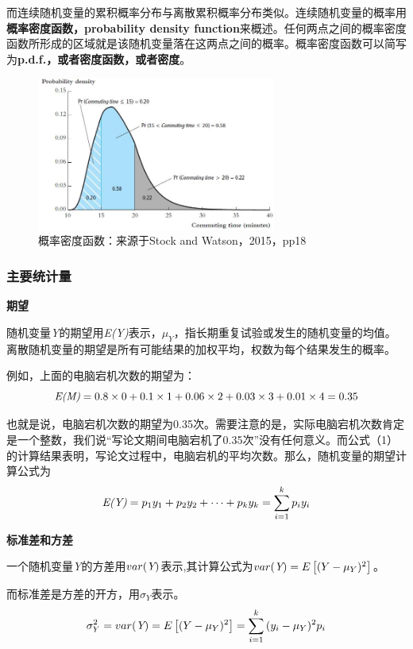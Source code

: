 \documentclass[cn,10pt,math=newtx,citestyle=gb7714-2015,bibstyle=gb7714-2015]{elegantbook}
\begin{document}
	而连续随机变量的累积概率分布与离散累积概率分布类似。连续随机变量的概率用\textbf{概率密度函数，probability density function}来概述。任何两点之间的概率密度函数所形成的区域就是该随机变量落在这两点之间的概率。概率密度函数可以简写为\textbf{p.d.f.，或者密度函数，或者密度}。
	\begin{figure}[htbp]
		\centering
		\includegraphics[width=0.7\textwidth]{pdf.jpg}
		\caption{概率密度函数：来源于Stock and Watson，2015，pp18}\label{fig:digit}
	\end{figure}
	
	\subsubsection{主要统计量}
	\textbf{期望}
	
	随机变量\emph{Y}的期望用\emph{E(Y)}表示，$\mu_{Y}$，指长期重复试验或发生的随机变量的均值。离散随机变量的期望是所有可能结果的加权平均，权数为每个结果发生的概率。
	
	例如，上面的电脑宕机次数的期望为：
	\begin{equation}
		\emph{E(M)}=0.8\times0+0.1\times1+0.06\times2+0.03\times3+0.01\times4=0.35
	\end{equation}
	
	也就是说，电脑宕机次数的期望为0.35次。需要注意的是，实际电脑宕机次数肯定是一个整数，我们说“写论文期间电脑宕机了0.35次”没有任何意义。而公式（1）的计算结果表明，写论文过程中，电脑宕机的平均次数。那么，随机变量的期望计算公式为
	\begin{equation}
		\emph{E(Y)}=p_1y_1+p_2y_2+\cdots+p_ky_k=\sum_{i=1}^{k}{p_iy_i}
	\end{equation}
	
	\textbf{标准差和方差}
	
	一个随机变量\emph{Y}的方差用$var(\emph{Y})$表示,其计算公式为$var(\emph{Y})=E\left[(Y-\mu_{Y})^2\right]$。
	
	而标准差是方差的开方，用$\sigma_{Y}$表示。
	\begin{equation}
		\sigma_{Y}^2=var(\emph{Y})=E\left[(Y-\mu_{Y})^2\right]=\sum_{i=1}^{k}{(y_i-\mu_{Y})^2p_i}
	\end{equation}
	
\end{document}
